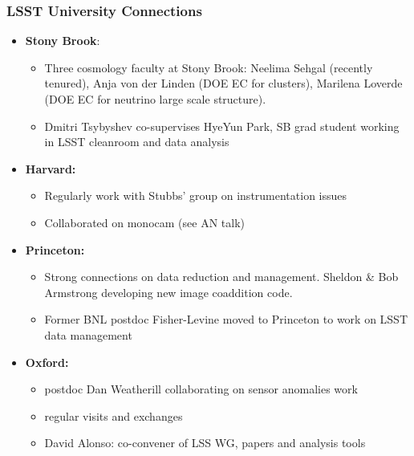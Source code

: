 \documentclass[aspectratio=169]{beamer}
\begin{document}
\begin{frame}
  \frametitle{LSST University Connections}

  \begin{itemize}


    \item \textbf{Stony Brook}:
        \begin{itemize}
      \item Three cosmology faculty at Stony Brook: Neelima Sehgal
        (recently tenured), Anja von der Linden (DOE EC for clusters),
        Marilena Loverde (DOE EC for neutrino large scale structure).
        
      \item Dmitri Tsybyshev co-supervises HyeYun Park, SB grad
        student working in LSST cleanroom and data analysis
        \end{itemize}


    \item \textbf{Harvard:}
        \begin{itemize}
            \item Regularly work with Stubbs' group on instrumentation
                issues
            \item Collaborated on monocam (see AN talk)
        \end{itemize}

    \item \textbf{Princeton:}
        \begin{itemize}
            \item Strong connections on data reduction and management.  Sheldon
                \& Bob Armstrong developing new image coaddition code.
            \item Former BNL postdoc Fisher-Levine moved to Princeton to
                work on LSST data management
        \end{itemize}

    \item \textbf{Oxford:}
        \begin{itemize}
          \item postdoc Dan Weatherill collaborating on sensor
            anomalies work
          \item regular visits and exchanges
          \item David Alonso: co-convener of LSS WG, papers and
            analysis tools
        \end{itemize}

\end{itemize}
\end{frame}
\end{document}
